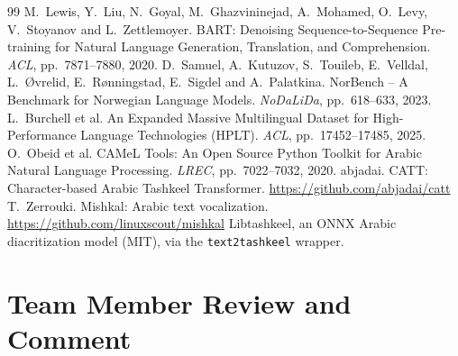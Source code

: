 \documentclass[10pt,a4paper]{article}
\begin{document}
\begin{thebibliography}{99}
 M.~Lewis, Y.~Liu, N.~Goyal, M.~Ghazvininejad, A.~Mohamed, O.~Levy, V.~Stoyanov and L.~Zettlemoyer. BART: Denoising Sequence-to-Sequence Pre-training for Natural Language Generation, Translation, and Comprehension. \emph{ACL}, pp.~7871--7880, 2020.
 D.~Samuel, A.~Kutuzov, S.~Touileb, E.~Velldal, L.~Øvrelid, E.~Rønningstad, E.~Sigdel and A.~Palatkina. NorBench -- A Benchmark for Norwegian Language Models. \emph{NoDaLiDa}, pp.~618--633, 2023.
 L.~Burchell et al. An Expanded Massive Multilingual Dataset for High-Performance Language Technologies (HPLT). \emph{ACL}, pp.~17452--17485, 2025.
 O.~Obeid et al. CAMeL Tools: An Open Source Python Toolkit for Arabic Natural Language Processing. \emph{LREC}, pp.~7022--7032, 2020.
 abjadai. CATT: Character-based Arabic Tashkeel Transformer. \url{https://github.com/abjadai/catt}
 T.~Zerrouki. Mishkal: Arabic text vocalization. \url{https://github.com/linuxscout/mishkal}
 Libtashkeel, an ONNX Arabic diacritization model (MIT), via the \texttt{text2tashkeel} wrapper.
\end{thebibliography}

\clearpage
\section{Team Member Review and Comment}
\end{document}
